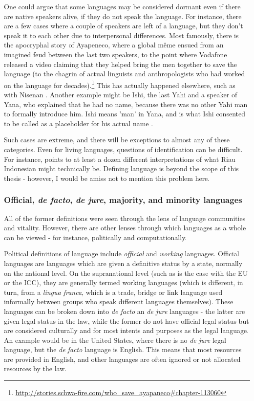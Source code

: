 One could argue that some languages may be considered dormant even if there are native speakers alive, if they do not speak the language. For instance, there are a few cases where a couple of speakers are left of a language, but they don't speak it to each other due to interpersonal differences. Most famously, there is the apocryphal story of Ayapeneco, where a global m\^eme ensued from an imagined feud between the last two speakers, to the point where Vodafone released a video claiming that they helped bring the men together to save the language (to the chagrin of actual linguists and anthropologists who had worked on the language for decades).\footnote{\href{http://stories.schwa-fire.com/who\_save\_ayapaneco\#chapter-113060}{http://stories.schwa-fire.com/who\_save\_ayapaneco\#chapter-113060}} This has actually happened elsewhere, such as with Nisenan \citep{snyder2004practice}. Another example might be Ishi, the last Yahi and a speaker of Yana, who explained that he had no name, because there was no other Yahi man to formally introduce him. Ishi means 'man' in Yana, and is what Ishi consented to be called as a placeholder for his actual name \citep{kroeber1973ishi}.

Such cases are extreme, and there will be exceptions to almost any of these categories. Even for living languages, questions of identification can be difficult. For instance, \cite{gilRiau} points to at least a dozen different interpretations of what Riau Indonesian might technically be. Defining language is beyond the scope of this thesis - however, I would be amiss not to mention this problem here.

\subsubsection{Official, \textit{de facto}, \textit{de jure}, majority, and minority languages}

All of the former definitions were seen through the lens of language communities and vitality. However, there are other lenses through which languages as a whole can be viewed - for instance, politically and computationally.

Political definitions of language include \textit{official} and \textit{working} languages. Official languages are languages which are given a definitive status by a state, normally on the national level. On the supranational level (such as is the case with the EU or the ICC), they are generally termed working languages (which is different, in turn, from a \textit{lingua franca}, which is a trade, bridge or link language used informally between groups who speak different languages themselves). These languages can be broken down into {\it de facto} an {\it de jure} languages - the latter are given legal status in the law, while the former do not have official legal status but are considered culturally and for most intents and purposes as the legal language. An example would be in the United States, where there is no {\it de jure} legal language, but the {\it de facto} language is English. This means that most resources are provided in English, and other languages are often ignored or not allocated resources by the law.

